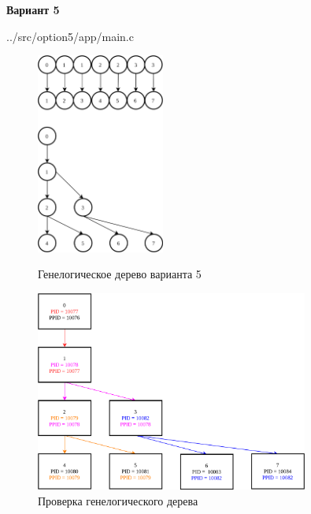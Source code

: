 \newpage

\textbf{Вариант 5}


{../src/option5/app/main.c}

\begin{figure}[!htp]
    \begin{minipage}{0.49\textwidth}
        \centering
        \includegraphics[height=6.6cm]
        {_INCLUDES/option5/option5.png}
        \caption{Генелогическое дерево варианта 5}
    \end{minipage}\hfill
    \begin{minipage}{0.49\textwidth}
        \centering
        \includegraphics[height=6.6cm]
        {_INCLUDES/option5/option5-test.png}
        \caption{Проверка генелогического дерева}
    \end{minipage}
\end{figure}

\newpage

